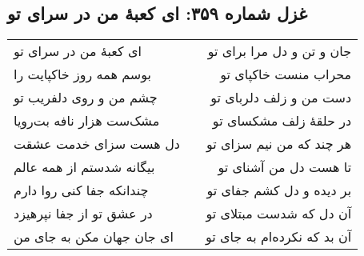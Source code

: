 \begin{center}
\section*{غزل شماره ۳۵۹: ای کعبهٔ من در سرای تو}
\label{sec:359}
\begin{longtable}{l p{0.5cm} r}
ای کعبهٔ من در سرای تو
&&
جان و تن و دل مرا برای تو
\\
بوسم همه روز خاکپایت را
&&
محراب منست خاکپای تو
\\
چشم من و روی دلفریب تو
&&
دست من و زلف دلربای تو
\\
مشک‌ست هزار نافه بت‌رویا
&&
در حلقهٔ زلف مشکسای تو
\\
دل هست سزای خدمت عشقت
&&
هر چند که من نیم سزای تو
\\
بیگانه شدستم از همه عالم
&&
تا هست دل من آشنای تو
\\
چندانکه جفا کنی روا دارم
&&
بر دیده و دل کشم جفای تو
\\
در عشق تو از جفا نپرهیزد
&&
آن دل که شدست مبتلای تو
\\
ای جان جهان مکن به جای من
&&
آن بد که نکرده‌ام به جای تو
\\
\end{longtable}
\end{center}
